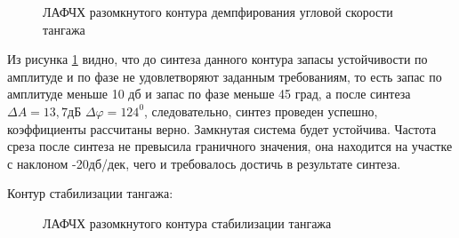 \begin{figure}[H]
    \caption{ЛАФЧХ разомкнутого контура демпфирования угловой скорости тангажа}
    \label{fig:Угловая скорость тангажа раз qMAX}
\end{figure}

Из рисунка \ref{fig:Угловая скорость тангажа раз qMAX} видно, что до синтеза данного контура запасы устойчивости по амплитуде и по фазе не удовлетворяют заданным требованиям, то есть запас по амплитуде меньше 10 дб и запас по фазе меньше 45 град, а после синтеза $\Delta A = 13,7 $дБ $\Delta \varphi = 124^0$, следовательно, синтез проведен успешно, коэффициенты рассчитаны верно. Замкнутая система будет устойчива. Частота среза после синтеза не превысила граничного значения, она находится на участке с наклоном -20дб/дек, чего и требовалось достичь в результате синтеза.  

\begin{center}
    Контур стабилизации тангажа:
\end{center}

\begin{figure}[H]
    \caption{ЛАФЧХ разомкнутого контура стабилизации тангажа}
    \label{fig:Тангаж раз qMAX}
\end{figure}

